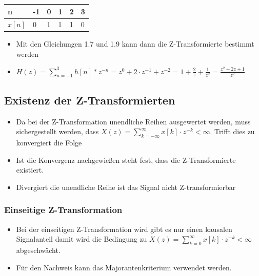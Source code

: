 \documentclass[11pt]{article}
\providecommand{\tightlist}{%
      \setlength{\itemsep}{0pt}\setlength{\parskip}{0pt}}
\def\lt{<}
\begin{document}
\begin{longtable}[]{@{}llllll@{}}
\toprule
n & -1 & 0 & 1 & 2 & 3\tabularnewline
\midrule
\endhead
\(x[n]\) & 0 & 1 & 1 & 1 & 0\tabularnewline
\bottomrule
\end{longtable}

    \begin{itemize}
\tightlist
\item
  Mit den Gleichungen 1.7 und 1.9 kann dann die Z-Transformierte
  bestimmt werden
\end{itemize}

    \begin{itemize}
\tightlist
\item
  \(H(z) = \sum_{n=-1}^{3} h[n] * z^{-n} = z^0 + 2 \cdot z^{-1} + z^{-2} = 1 + \frac{2}{z} + \frac{1}{z^2} = \frac{z^2 + 2z + 1}{z^2}\)
\end{itemize}

    \subsection{Existenz der
Z-Transformierten}\label{existenz-der-z-transformierten}

\begin{itemize}
\item
  Da bei der Z-Transformation unendliche Reihen ausgewertet werden, muss
  sichergestellt werden, dass
  \(X(z) = \sum_{k=-\infty}^\infty x[k] \cdot z^{-k} \lt \infty\).
  Trifft dies zu konvergiert die Folge
\item
  Ist die Konvergenz nachgewießen steht fest, dass die Z-Transformierte
  existiert.
\item
  Divergiert die unendliche Reihe ist das Signal nicht Z-transformierbar
\end{itemize}

    \subsubsection{Einseitige
Z-Transformation}\label{einseitige-z-transformation}

\begin{itemize}
\item
  Bei der einseitigen Z-Transformation wird gibt es nur einen kausalen
  Signalanteil damit wird die Bedingung zu
  \(X(z) = \sum_{k=0}^\infty x[k] \cdot z^{-k} < \infty\) abgeschwächt.
\item
  Für den Nachweis kann das Majorantenkriterium verwendet werden.
\end{itemize}
\end{document}
